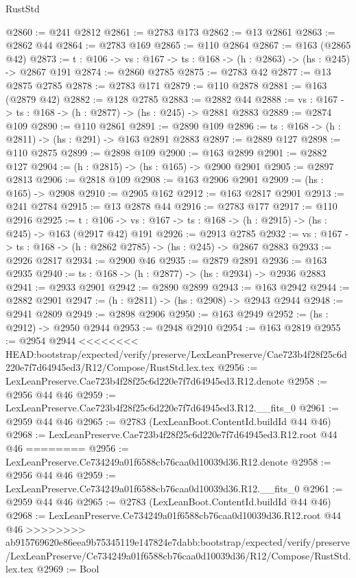 \begin{lexlean}{RustStd}
\begin{coremodule}
{\begin{coremodule}
{{{@2860 := @241 @2812
@2861 := @2783 @173
@2862 := @13 @2861
@2863 := @2862 @44
@2864 := @2783 @169
@2865 := @110 @2864
@2867 := @163 (@2865 @42)
@2873 := {t : @106} -> {vs : @167} -> {ts : @168} -> (h : @2863) -> (hs : @245) -> @2867 @191
@2874 := @2860 @2785
@2875 := @2783 @42
@2877 := @13 @2875 @2785
@2878 := @2783 @171
@2879 := @110 @2878
@2881 := @163 (@2879 @42)
@2882 := @128 @2785
@2883 := @2882 @44
@2888 := {vs : @167} -> {ts : @168} -> (h : @2877) -> (hs : @245) -> @2881 @2883
@2889 := @2874 @109
@2890 := @110 @2861
@2891 := @2890 @109
@2896 := {ts : @168} -> (h : @2811) -> (hs : @291) -> @163 @2891 @2883
@2897 := @2889 @127
@2898 := @110 @2875
@2899 := @2898 @109
@2900 := @163 @2899
@2901 := @2882 @127
@2904 := (h : @2815) -> (hs : @165) -> @2900 @2901
@2905 := @2897 @2813
@2906 := @2818 @109
@2908 := @163 @2906 @2901
@2909 := (hs : @165) -> @2908
@2910 := @2905 @162
@2912 := @163 @2817 @2901
@2913 := @241 @2784
@2915 := @13 @2878 @44
@2916 := @2783 @177
@2917 := @110 @2916
@2925 := {t : @106} ->
  {vs : @167} -> {ts : @168} -> (h : @2915) -> (hs : @245) -> @163 (@2917 @42) @191
@2926 := @2913 @2785
@2932 := {vs : @167} -> {ts : @168} -> (h : @2862 @2785) -> (hs : @245) -> @2867 @2883
@2933 := @2926 @2817
@2934 := @2900 @46
@2935 := @2879 @2891
@2936 := @163 @2935
@2940 := {ts : @168} -> (h : @2877) -> (hs : @2934) -> @2936 @2883
@2941 := @2933 @2901
@2942 := @2890 @2899
@2943 := @163 @2942
@2944 := @2882 @2901
@2947 := (h : @2811) -> (hs : @2908) -> @2943 @2944
@2948 := @2941 @2809
@2949 := @2898 @2906
@2950 := @163 @2949
@2952 := (hs : @2912) -> @2950 @2944
@2953 := @2948 @2910
@2954 := @163 @2819
@2955 := @2954 @2944
<<<<<<<< HEAD:bootstrap/expected/verify/preserve/LexLeanPreserve/Cae723b4f28f25c6d220e7f7d64945ed3/R12/Compose/RustStd.lex.tex
@2956 := LexLeanPreserve.Cae723b4f28f25c6d220e7f7d64945ed3.R12.denote
@2958 := @2956 @44 @46
@2959 := LexLeanPreserve.Cae723b4f28f25c6d220e7f7d64945ed3.R12.__fits_0
@2961 := @2959 @44 @46
@2965 := @2783 (LexLeanBoot.ContentId.buildId @44 @46)
@2968 := LexLeanPreserve.Cae723b4f28f25c6d220e7f7d64945ed3.R12.root @44 @46
========
@2956 := LexLeanPreserve.Ce734249a01f6588cb76caa0d10039d36.R12.denote
@2958 := @2956 @44 @46
@2959 := LexLeanPreserve.Ce734249a01f6588cb76caa0d10039d36.R12.__fits_0
@2961 := @2959 @44 @46
@2965 := @2783 (LexLeanBoot.ContentId.buildId @44 @46)
@2968 := LexLeanPreserve.Ce734249a01f6588cb76caa0d10039d36.R12.root @44 @46
>>>>>>>> ab915769620e86eea9b75345119e147824e7dabb:bootstrap/expected/verify/preserve/LexLeanPreserve/Ce734249a01f6588cb76caa0d10039d36/R12/Compose/RustStd.lex.tex
@2969 := Bool
}}}
\end{coremodule}}
\end{coremodule}
\end{lexlean}
